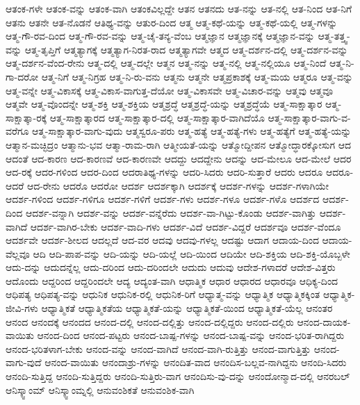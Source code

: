 {ಆತಂಕ-ಗಳೇ
ಆತಂಕ-ವನ್ನು
ಆತಂಕ-ವಾಗಿ
ಆತಂಕವಿಲ್ಲದ್ದೇ
ಆತನ
ಆತನದು
ಆತ-ನನ್ನು
ಆತ-ನಲ್ಲಿ
ಆತ-ನಿಂದ
ಆತ-ನಿಗೆ
ಆತನು
ಆತನೇ
ಆತ-ನೊಡನೆ
ಆತಿಥ್ಯ-ವನ್ನು
ಆತುರ-ದಿಂದ
ಆತ್ಮ
ಆತ್ಮ-ಕಥೆ-ಯನ್ನು
ಆತ್ಮ-ಕಥೆ-ಯಲ್ಲಿ
ಆತ್ಮ-ಗಳನ್ನು
ಆತ್ಮ-ಗೌ-ರವ-ದಿಂದ
ಆತ್ಮ-ಗೌ-ರವ-ವನ್ನು
ಆತ್ಮ-ಚೈ-ತನ್ಯ-ವೆಂಬ
ಆತ್ಮಜ್ಞಾನ
ಆತ್ಮಜ್ಞಾನಕ್ಕೆ
ಆತ್ಮಜ್ಞಾನ-ವನ್ನು
ಆತ್ಮ-ತತ್ತ್ವ-ವನ್ನು
ಆತ್ಮ-ತೃಪ್ತಿಗೆ
ಆತ್ಮತ್ಯಾಗಕ್ಕೆ
ಆತ್ಮತ್ಯಾಗ-ನಿರತ-ರಾದ
ಆತ್ಮತ್ಯಾಗವೇ
ಆತ್ಮದ
ಆತ್ಮ-ದರ್ಶನ-ದಲ್ಲಿ
ಆತ್ಮ-ದರ್ಶನ-ವನ್ನು
ಆತ್ಮ-ದರ್ಶನ-ವೆಂದ-ರೇನು
ಆತ್ಮ-ದಲ್ಲಿ
ಆತ್ಮ-ದಲ್ಲೇ
ಆತ್ಮನ
ಆತ್ಮ-ನನ್ನು
ಆತ್ಮ-ನಲ್ಲಿ
ಆತ್ಮ-ನಲ್ಲಿಯೂ
ಆತ್ಮ-ನಿಂದೆ
ಆತ್ಮ-ನಿ-ಗಾ-ದರೋ
ಆತ್ಮ-ನಿಗೆ
ಆತ್ಮ-ನಿಗ್ರಹ
ಆತ್ಮ-ನಿ-ರು-ವನು
ಆತ್ಮನು
ಆತ್ಮನೇ
ಆತ್ಮಪ್ರಕಾಶಕ್ಕೆ
ಆತ್ಮ-ಮಯ
ಆತ್ಮರೂ
ಆತ್ಮ-ವನ್ನು
ಆತ್ಮ-ವನ್ನೇ
ಆತ್ಮ-ವಿಕಾಸಕ್ಕೆ
ಆತ್ಮ-ವಿಕಾಸ-ವಾಗುತ್ತ-ದೆಯೋ
ಆತ್ಮ-ವಿಕಾಸವೇ
ಆತ್ಮ-ವಿಚಾರ-ವನ್ನು
ಆತ್ಮವು
ಆತ್ಮವೂ
ಆತ್ಮವೇ
ಆತ್ಮ-ವೊಂದನ್ನೇ
ಆತ್ಮ-ಶಕ್ತಿ
ಆತ್ಮ-ಶಕ್ತಿಯ
ಆತ್ಮಶ್ರದ್ಧೆ
ಆತ್ಮಶ್ರದ್ಧೆ-ಯನ್ನು
ಆತ್ಮಶ್ರದ್ಧೆಯೆ
ಆತ್ಮ-ಸಾಕ್ಷಾತ್ಕಾರ
ಆತ್ಮ-ಸಾಕ್ಷಾತ್ಕಾ-ರಕ್ಕೆ
ಆತ್ಮ-ಸಾಕ್ಷಾತ್ಕಾರದ
ಆತ್ಮ-ಸಾಕ್ಷಾತ್ಕಾರ-ದಲ್ಲಿ
ಆತ್ಮ-ಸಾಕ್ಷಾತ್ಕಾರ-ವಾಗಿದೆಯೊ
ಆತ್ಮ-ಸಾಕ್ಷಾತ್ಕಾರ-ವಾಗು-ವ-ವರೆಗೂ
ಆತ್ಮ-ಸಾಕ್ಷಾತ್ಕಾರ-ವಾಗು-ವುದು
ಆತ್ಮಸ್ವರೂ-ಪರು
ಆತ್ಮ-ಹತ್ಯೆ
ಆತ್ಮ-ಹತ್ಯೆ-ಗಳು
ಆತ್ಮ-ಹತ್ಯೆಗೆ
ಆತ್ಮ-ಹತ್ಯೆ-ಯನ್ನು
ಆತ್ಮಾನ-ಮಚ್ಛಿದ್ರಂ
ಆತ್ಮಾನು-ಭವ
ಆತ್ಮಾ-ರಾಮ-ರಾಗಿ
ಆತ್ಮೀಯತೆ-ಯನ್ನು
ಆತ್ಮೋದ್ದೀಪನ
ಆತ್ಮೋದ್ಧಾರಕ್ಕೋಸುಗ
ಆದ
ಆದಂತೆ
ಆದ-ಕಾರಣ
ಆದ-ಕಾರಣವೆ
ಆದ-ಕಾರಣವೇ
ಆದದ್ದು
ಆದದ್ದೇನು
ಆದನ್ನು
ಆದ-ಮೇಲೂ
ಆದ-ಮೇಲೆ
ಆದರ
ಆದ-ರಕ್ಕೆ
ಆದರ-ಗಳಿಂದ
ಆದರ-ದಿಂದ
ಆದರಾತಿಥ್ಯ-ಗಳನ್ನು
ಆದರಿ-ಸಿದರು
ಆದರಿ-ಸುತ್ತಾರೆ
ಆದರು
ಆದರೂ
ಆದರೂ-
ಆದರೆ
ಆದ-ರೇನು
ಆದರೊ
ಆದರೋ
ಆದರ್ಶ
ಆದರ್ಶಕ್ಕಾಗಿ
ಆದರ್ಶಕ್ಕೆ
ಆದರ್ಶ-ಗಳನ್ನು
ಆದರ್ಶ-ಗಳಾಗಿಯೇ
ಆದರ್ಶ-ಗಳಿಂದ
ಆದರ್ಶ-ಗಳಿಗೂ
ಆದರ್ಶ-ಗಳಿಗೆ
ಆದರ್ಶ-ಗಳು
ಆದರ್ಶ-ಗಳೂ
ಆದರ್ಶ-ಗಳೊ
ಆದರ್ಶದ
ಆದರ್ಶ-ದಿಂದ
ಆದರ್ಶ-ವನ್ನಾಗಿ
ಆದರ್ಶ-ವನ್ನು
ಆದರ್ಶ-ವನ್ನೆರೆದು
ಆದರ್ಶ-ವಾ-ಗಿಟ್ಟು-ಕೊಂಡು
ಆದರ್ಶ-ವಾಗಿತ್ತು
ಆದರ್ಶ-ವಾಗಿದೆ
ಆದರ್ಶ-ವಾಗಿರ-ಬೇಕು
ಆದರ್ಶ-ವಾದಿ-ಗಳು
ಆದರ್ಶ-ವಿದೆ
ಆದರ್ಶ-ವಿದ್ದರೆ
ಆದರ್ಶವೂ
ಆದರ್ಶ-ವೆಂದೂ
ಆದರ್ಶವೇ
ಆದರ್ಶ-ಶೀಲದ
ಆದಲ್ಲದೆ
ಆದ-ವರ
ಆದವು
ಆದವು-ಗಳಲ್ಲ
ಆದಷ್ಟು
ಆದಾಗ
ಆದಾಯ-ದಿಂದ
ಆದಾಯ-ವೆಲ್ಲವೂ
ಆದಿ
ಆದಿ-ಪಾಪ-ವನ್ನು
ಆದಿ-ಯನ್ನು
ಆದಿ-ಯಲ್ಲೆ
ಆದಿ-ಯಿಂದ
ಆದಿಯೇ
ಆದಿ-ಶಕ್ತಿಯ
ಆದಿ-ಶಕ್ತಿ-ಯೊಬ್ಬಳೇ
ಆದು-ದನ್ನು
ಆದುದನ್ನೆಲ್ಲ
ಆದು-ದರಿಂದ
ಆದು-ದರಿಂದಲೇ
ಆದುದು
ಆದುವು
ಆದೇಶ-ಗಳಾದರೆ
ಆದೇಶ-ವಿತ್ತರು
ಆದೊಂದು
ಆದ್ದರಿಂದ
ಆದ್ದರಿಂದಲೇ
ಆದ್ಯ
ಆದ್ಯಂತ-ವಾಗಿ
ಆಧಾತ್ಮಿಕ
ಆಧಾರ
ಆಧಾರದ
ಆಧಾರವೂ
ಆಧಿಕ್ಯ-ದಿಂದ
ಆಧಿಪತ್ಯ
ಆಧಿಪತ್ಯ-ವನ್ನು
ಆಧುನಿಕ
ಆಧುನಿಕ-ರಲ್ಲಿ
ಆಧುನಿಕ-ರಿಗೆ
ಆಧ್ಯಾತ್ಮ-ವನ್ನು
ಆಧ್ಯಾತ್ಮಿಕ
ಆಧ್ಯಾತ್ಮಿಕಕ್ಕಿಂತ
ಆಧ್ಯಾತ್ಮಿಕ-ಜೀವಿ-ಗಳು
ಆಧ್ಯಾತ್ಮಿಕತೆ
ಆಧ್ಯಾತ್ಮಿಕತೆಯ
ಆಧ್ಯಾತ್ಮಿಕತೆ-ಯನ್ನು
ಆಧ್ಯಾತ್ಮಿಕತೆ-ಯಿಂದ
ಆಧ್ಯಾತ್ಮಿಕತೆ-ಯೆಲ್ಲ
ಆನಂತರ
ಆನಂದ
ಆನಂದಕ್ಕೆ
ಆನಂದದ
ಆನಂದ-ದಲ್ಲಿ
ಆನಂದ-ದಲ್ಲಿತ್ತು
ಆನಂದ-ದಲ್ಲಿದ್ದರು
ಆನಂದ-ದಲ್ಲಿರು
ಆನಂದ-ದಾಯಕ-ವಾಯಿತು
ಆನಂದ-ದಿಂದ
ಆನಂದ-ಪಟ್ಟರು
ಆನಂದ-ಬಾಷ್ಪ-ಗಳನ್ನು
ಆನಂದ-ಬಾಷ್ಪ-ವನ್ನು
ಆನಂದ-ಭರಿತ-ರಾಗಿದ್ದರು
ಆನಂದ-ಭರಿತಳಾಗ-ಬೇಕು
ಆನಂದ-ವನ್ನು
ಆನಂದ-ವಾಗಿದೆ
ಆನಂದ-ವಾಗಿ-ರುತ್ತಿತ್ತು
ಆನಂದ-ವಾಗುತ್ತಿತ್ತು
ಆನಂದ-ವಾಗು-ವುದೆ
ಆನಂದ-ವಾಯಿತು
ಆನಂದಾಶ್ರು-ಗಳನ್ನು
ಆನಂದಿತ-ವಾದ
ಆನಂದಿಸ-ಬಲ್ಲವ-ನಾಗಿದ್ದನು
ಆನಂದಿ-ಸಿದರು
ಆನಂದಿ-ಸುತ್ತಿದ್ದ
ಆನಂದಿ-ಸುತ್ತಿದ್ದರು
ಆನಂದಿ-ಸುತ್ತಿರು-ವಾಗ
ಆನಂದಿಸು-ವು-ದನ್ನು
ಆನಂದೋನ್ಮಾದ-ದಲ್ಲಿ
ಆನರಬಲ್
ಆನಿಸ್ಕ್ವಾಂಮ್
ಆನಿಸ್ಕ್ವಾಂಮ್ನಲ್ಲಿ
ಆನುವಂಶಿಕತೆ
ಆನುವಂಶಿಕ-ವಾಗಿ
}
